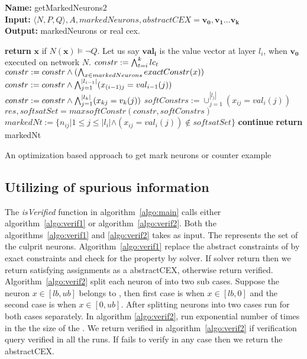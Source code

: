 \begin{algorithm}[t]
  \textbf{Name: } getMarkedNeurons2 \\
  \textbf{Input: } $\langle N,P,Q \rangle,A,markedNeurons,abstractCEX = \boldsymbol{v_0}, \boldsymbol{v_1} ... \boldsymbol{v_k}$\\
  \textbf{Output: } markedNeurons or real cex. 
  \begin{algorithmic}[1]
    \State \textbf{return} $\boldsymbol{x}$ if $N(\boldsymbol{x}) \models \neg Q$. 
    \State Let us say $\boldsymbol{val_{i}}$ is the value vector at layer $l_i$, when $\boldsymbol{v_0}$ executed on network $N$. 
     
        \State $constr := \bigwedge_{t=i}^k lc_t$
        \State $constr := constr \land (\bigwedge_{x \in markedNeurons} exactConstr(x))$ 
        \State $constr := constr \land \bigwedge_{j=1}^{|l_{i-1}|} (x_{(i-1)j} = val_{i-1}(j))$
        \State $constr := constr \land \bigwedge_{j=1}^{|l_k|} (x_{kj} = v_k(j))$
        \State $softConstrs := \cup_{j=1}^{|l_j|} (x_{ij} = val_i(j))$
        \State $res, softsatSet = maxsoftConstr(constr, softConstrs)$ 
        \State $markedNt := \{n_{ij} | 1 \leq j \leq |l_i| \land (x_{ij} = val_i(j)) \notin  softsatSet\}$ 
          \State \textbf{continue}
        \Else
          \State \textbf{return} markedNt
        \EndIf 
      \EndIf
    \EndFor
  \end{algorithmic}
  \caption{An optimization based approach to get mark neurons or counter example}
  \label{algo:refine2}
\end{algorithm}






\subsection{Utilizing of spurious information}

The \emph{isVerified} function in algorithm~\ref{algo:main} calls either algorithm~\ref{algo:verif1} or algorithm~\ref{algo:verif2}. 
Both the algorithms~\ref{algo:verif1} and \ref{algo:verif2} takes \markednewrons{} as input. 
The \markednewrons{} represents the set of the culprit neurons. 
Algorithm~\ref{algo:verif1} replace the abstract constraints of \markednewrons{} by exact constraints and check for the 
property by \milp{} solver. If \milp{} solver return \sat{} then we return satisfying assignments as a abstractCEX, 
otherwise return verified. Algorithm~\ref{algo:verif2} split each neuron of \markednewrons{} into two sub cases. Suppose the 
neuron $x\in [lb,ub]$ belongs to \markednewrons{}, then first case is when $x \in [lb,0]$ and the second case is when $x \in [0,ub]$.   
After splitting neurons into two cases \deeppoly{} run for both cases separately. In algorithm \ref{algo:verif2}, \deeppoly{}
run exponential number of times in the the size of the \markednewrons{}. We return verified in algorithm~\ref{algo:verif2} if 
verification query verified in all the \deeppoly{} runs. If \deeppoly{} fails to verify in any case then we return the abstractCEX. 


